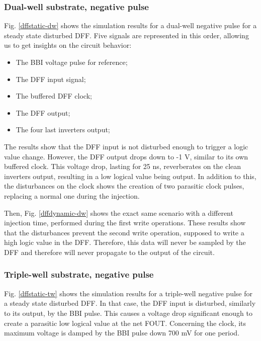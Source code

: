	\subsubsection{Dual-well substrate, negative pulse}
		
		Fig. \ref{dffstatic-dw} shows the simulation results for a dual-well negative pulse for a steady state disturbed DFF.
		Five signals are represented in this order, allowing us to get insights on the circuit behavior:
		\begin{itemize}
			\item The BBI voltage pulse for reference;
			\item The DFF input signal;
			\item The buffered DFF clock;
			\item The DFF output;
			\item The four last inverters output;
		\end{itemize}
		The results show that the DFF input is not disturbed enough to trigger a logic value change.
		However, the DFF output drops down to -1 V, similar to its own buffered clock.
		This voltage drop, lasting for 25 ns, reverberates on the clean inverters output, resulting in a low logical value being output.
		In addition to this, the disturbances on the clock shows the creation of two parasitic clock pulses, replacing a normal one during the injection.
		
		
		Then, Fig. \ref{dffdynamic-dw} shows the exact same scenario with a different injection time, performed during the first write operations.
		These results show that the disturbances prevent the second write operation, supposed to write a high logic value in the DFF.
		Therefore, this data will never be sampled by the DFF and therefore will never propagate to the output of the circuit.
	
	\subsubsection{Triple-well substrate, negative pulse}
		
		Fig. \ref{dffstatic-tw} shows the simulation results for a triple-well negative pulse for a steady state disturbed DFF.
		In that case, the DFF input is disturbed, similarly to its output, by the BBI pulse.
		This causes a voltage drop significant enough to create a parasitic low logical value at the net FOUT.
		Concerning the clock, its maximum voltage is damped by the BBI pulse down 700 mV for one period.
		
